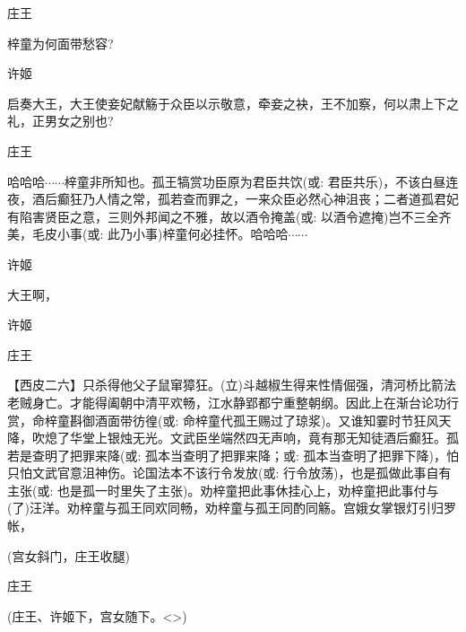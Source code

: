 {庄王\hspace{30pt}~

梓童为何面带愁容?

许姬

启奏大王，大王使妾妃献觞于众臣以示敬意，牵妾之袂，王不加察，何以肃上下之礼，正男女之别也?

庄王

哈哈哈$\cdots{}\cdots{}$梓童非所知也。孤王犒赏功臣原为君臣共饮({\akai 或}: 君臣共乐)，不该白昼连夜，酒后癫狂乃人情之常，孤若查而罪之，一来众臣必然心神沮丧；二者道孤君妃有陷害贤臣之意，三则外邦闻之不雅，故以酒令掩盖({\akai 或}: 以酒令遮掩)岂不三全齐美，毛皮小事({\akai 或}: 此乃小事)梓童何必挂怀。哈哈哈$\cdots{}\cdots{}$

许姬\hspace{30pt}~

大王啊，

许姬


庄王


【{\akai 西皮二六}】只杀得他父子鼠窜獐狂。(立)斗越椒生得来性情倔强，清河桥比箭法老贼身亡。才能得阖朝中清平欢畅，江水静郢都宁重整朝纲。因此上在渐台论功行赏，命梓童斟御酒面带彷徨({\akai 或}: 命梓童代孤王赐过了琼浆)。又谁知霎时节狂风天降，吹熄了华堂上银烛无光。文武臣坐端然四无声响，竟有那无知徒酒后癫狂。孤若是查明了把罪来降({\akai 或}: 孤本当查明了把罪来降；或: 孤本当查明了把罪下降)，怕只怕文武官意沮神伤。论国法本不该行令发放({\akai 或}: 行令放荡)，也是孤做此事自有主张({\akai 或}: 也是孤一时里失了主张)。劝梓童把此事休挂心上，劝梓童把此事付与(了)汪洋。劝梓童与孤王同欢同畅，劝梓童与孤王同酌同觞。宫娥女掌银灯引归罗帐，

(宫女斜门，庄王收腿)

庄王\hspace{30pt}~


(庄王、许姬下，宫女随下。\textless{}\!\textgreater{})

\vspace{5pt}

}
